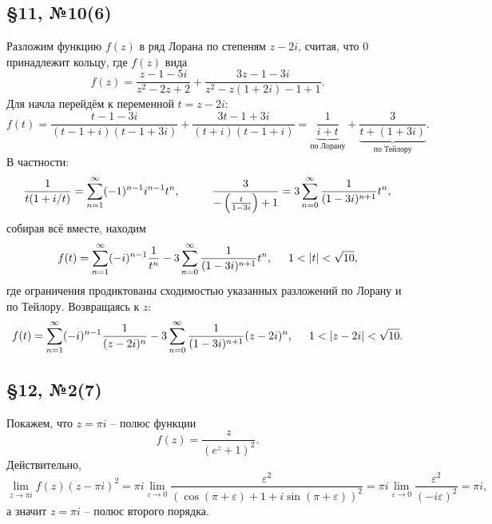 \subsection*{\S11, №10(6)}

Разложим функцию $f(z)$ в ряд Лорана по степеням $z-2i$, считая, что $0$ принадлежит кольцу, где $f(z)$ вида
\begin{equation*}
    f(z) = \frac{z-1- 5i}{z^2 -2z + 2} + \frac{3z - 1 - 3i}{z^2 - z(1 + 2i) - 1 + 1}.
\end{equation*}
Для начла перейдём к переменной $t = z - 2i$:
\begin{equation*}
    f(t) = \frac{t-1-3i}{(t-1+i)(t-1+3i)} + \frac{3t - 1 + 3i}{(t+i)(t-1+i)} = 
    \underbrace{\frac{1}{i + t}}_{\text{по Лорану}} + \underbrace{\frac{3}{t + (1 + 3i)}}_{\text{по Тейлору}}.
\end{equation*}
В частности:
\begin{equation*}
    \frac{1}{t(1 + i/t)} = \sum_{n=1}^{\infty}  (-1)^{n-1} i^{n-1} t^n,
    \hspace{10 mm} 
    \frac{3}{- \left(\frac{t}{1-3i}\right) + 1} = 3 \sum_{n=0}^{\infty} \frac{1}{(1-3i)^{n+1}} t^n,
\end{equation*}
собирая всё вместе, находим
\begin{equation*}
    f(t) = \sum_{n=1}^{\infty} (-i)^{n-1} \frac{1}{t^n} -3 \sum_{n=0}^{\infty} \frac{1}{(1-3i)^{n+1}} t^n,
    \hspace{5 mm} 
    1 < |t| < \sqrt{10},
\end{equation*}
где ограничения продиктованы сходимостью указанных разложений по Лорану и по Тейлору. Возвращаясь к $z$:
\begin{equation*}
    f(t) = \sum_{n=1}^{\infty} (-i)^{n-1} \frac{1}{(z-2i)^n} -3 \sum_{n=0}^{\infty} \frac{1}{(1-3i)^{n+1}} (z-2i)^n,
    \hspace{5 mm} 
    1 < |z - 2i| < \sqrt{10}.
\end{equation*}


\subsection*{\S12, №2(7)}

Покажем, что $z = \pi i $ -- полюс функции
\begin{equation*}
    f(z) = \frac{z}{(e^z + 1)^2}.
\end{equation*}
Действительно,
\begin{equation*}
    \lim_{z \to \pi i} f(z) (z - \pi i)^2 = \pi i \lim_{\varepsilon \to 0}
    \frac{\varepsilon^2}{(\cos (\pi + \varepsilon) + 1  + i \sin(\pi + \varepsilon))^2} = 
    \pi i \lim_{\varepsilon \to 0} \frac{\varepsilon^2}{(- i \varepsilon)^2} = \pi i,
\end{equation*}
а значит $z = \pi i $ -- полюс второго порядка.



